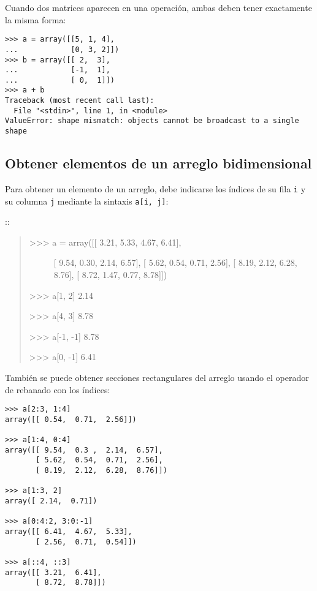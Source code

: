Cuando dos matrices aparecen en una operación, ambas deben tener
exactamente la misma forma:

\begin{lstlisting}
>>> a = array([[5, 1, 4],
...            [0, 3, 2]])
>>> b = array([[ 2,  3],
...            [-1,  1],
...            [ 0,  1]])
>>> a + b
Traceback (most recent call last):
  File "<stdin>", line 1, in <module>
ValueError: shape mismatch: objects cannot be broadcast to a single shape
\end{lstlisting}

\subsection{Obtener elementos de un arreglo bidimensional}

Para obtener un elemento de un arreglo, debe indicarse los índices de su
fila \lstinline!i! y su columna \lstinline!j! mediante la sintaxis
\lstinline!a[i, j]!:

::

\begin{quote}
\begin{description}
\item[\textgreater{}\textgreater{}\textgreater{} a = array({[}{[} 3.21,
5.33, 4.67, 6.41{]},]
{[} 9.54, 0.30, 2.14, 6.57{]}, {[} 5.62, 0.54, 0.71, 2.56{]}, {[} 8.19,
2.12, 6.28, 8.76{]}, {[} 8.72, 1.47, 0.77, 8.78{]}{]})
\end{description}

\textgreater{}\textgreater{}\textgreater{} a{[}1, 2{]} 2.14

\textgreater{}\textgreater{}\textgreater{} a{[}4, 3{]} 8.78

\textgreater{}\textgreater{}\textgreater{} a{[}-1, -1{]} 8.78

\textgreater{}\textgreater{}\textgreater{} a{[}0, -1{]} 6.41
\end{quote}

También se puede obtener secciones rectangulares del arreglo usando el
operador de rebanado con los índices:

\begin{lstlisting}
>>> a[2:3, 1:4]
array([[ 0.54,  0.71,  2.56]])

>>> a[1:4, 0:4]
array([[ 9.54,  0.3 ,  2.14,  6.57],
       [ 5.62,  0.54,  0.71,  2.56],
       [ 8.19,  2.12,  6.28,  8.76]])

>>> a[1:3, 2]
array([ 2.14,  0.71])

>>> a[0:4:2, 3:0:-1]
array([[ 6.41,  4.67,  5.33],
       [ 2.56,  0.71,  0.54]])

>>> a[::4, ::3]
array([[ 3.21,  6.41],
       [ 8.72,  8.78]])
\end{lstlisting}

